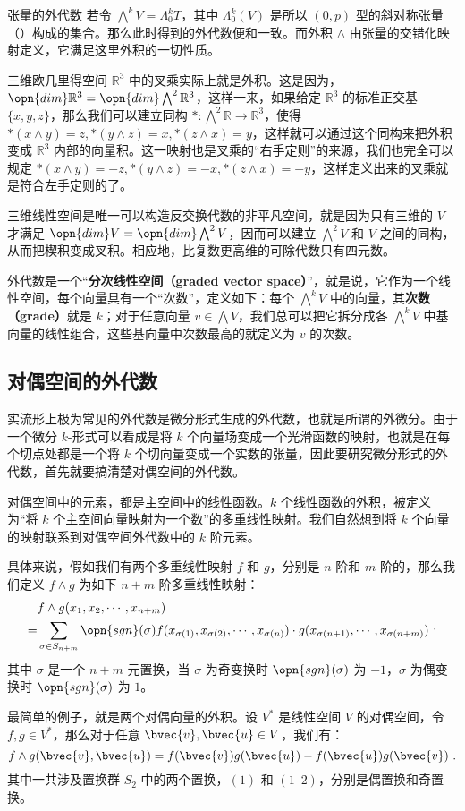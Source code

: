 \begin{example}{张量的外代数}
若令 $\bigwedge^k V=\Lambda^k_0 T$，其中 $\Lambda^k_0(V)$ 是所以 $(0,p)$ 型的斜对称张量（）构成的集合。那么此时得到的外代数便和一致。而外积 $\wedge$ 由张量的交错化映射定义，它满足这里外积的一切性质。
\end{example}


三维欧几里得空间 $\mathbb{R}^3$ 中的叉乘实际上就是外积。这是因为，$\opn{dim}\mathbb{R}^3=\opn{dim}\bigwedge^2\mathbb{R}^3$，这样一来，如果给定 $\mathbb{R}^3$ 的标准正交基 $\{x, y, z\}$，那么我们可以建立同构 $*: \bigwedge^2\mathbb{R}\rightarrow\mathbb{R}^3$，使得 $*(x\wedge y)=z, *(y\wedge z)=x, *(z\wedge x)=y$，这样就可以通过这个同构来把外积变成 $\mathbb{R}^3$ 内部的向量积。这一映射也是叉乘的“右手定则”的来源，我们也完全可以规定 $*(x\wedge y)=-z, *(y\wedge z)=-x, *(z\wedge x)=-y$，这样定义出来的叉乘就是符合左手定则的了。

三维线性空间是唯一可以构造反交换代数的非平凡空间，就是因为只有三维的 $V$ 才满足 $\opn{dim}V=\opn{dim}\bigwedge^2V$，因而可以建立 $\bigwedge^2 V$ 和 $V$ 之间的同构，从而把楔积变成叉积。相应地，比复数更高维的可除代数只有四元数。

外代数是一个“\textbf{分次线性空间（graded vector space）}”，就是说，它作为一个线性空间，每个向量具有一个“次数”，定义如下：每个 $\bigwedge^kV$ 中的向量，其\textbf{次数（grade）}就是 $k$；对于任意向量 $v\in \bigwedge V$，我们总可以把它拆分成各 $\bigwedge^kV$ 中基向量的线性组合，这些基向量中次数最高的就定义为 $v$ 的次数。


\subsection{对偶空间的外代数}\label{sub_ExtAlg_1}

实流形上极为常见的外代数是微分形式生成的外代数，也就是所谓的外微分。由于一个微分 $k$-形式可以看成是将 $k$ 个向量场变成一个光滑函数的映射，也就是在每个切点处都是一个将 $k$ 个切向量变成一个实数的张量，因此要研究微分形式的外代数，首先就要搞清楚对偶空间的外代数。

对偶空间中的元素，都是主空间中的线性函数。$k$ 个线性函数的外积，被定义为“将 $k$ 个主空间向量映射为一个数”的多重线性映射。我们自然想到将 $k$ 个向量的映射联系到对偶空间外代数中的 $k$ 阶元素。

具体来说，假如我们有两个多重线性映射 $f$ 和 $g$，分别是 $n$ 阶和 $m$ 阶的，那么我们定义 $f\wedge g$ 为如下 $n+m$ 阶多重线性映射：
\begin{equation}
\begin{aligned}
&f\wedge g(x_1, x_2, \cdots, x_{n+m})\\=
&\sum\limits_{\sigma\in S_{n+m}}\opn{sgn}(\sigma) f(x_{\sigma(1)}, x_{\sigma(2)}, \cdots, x_{\sigma(n)})\cdot g(x_{\sigma(n+1)}, \cdots, x_{\sigma(n+m)})
\end{aligned}~.
\end{equation}
其中 $\sigma$ 是一个 $n+m$ 元置换，当 $\sigma$ 为奇变换时 $\opn{sgn}(\sigma)$ 为 $-1$，$\sigma$ 为偶变换时 $\opn{sgn}(\sigma)$ 为 $1$。

最简单的例子，就是两个对偶向量的外积。设 $V^*$ 是线性空间 $V$ 的对偶空间，令 $f, g\in V^*$，那么对于任意 $\bvec{v}, \bvec{u}\in V$，我们有：
\begin{equation}
f\wedge g(\bvec{v}, \bvec{u})=f(\bvec{v})g(\bvec{u})-f(\bvec{u})g(\bvec{v})~.
\end{equation}
其中一共涉及置换群 $S_2$ 中的两个置换，$(1)$ 和 $(1\phantom{2}2)$，分别是偶置换和奇置换。
